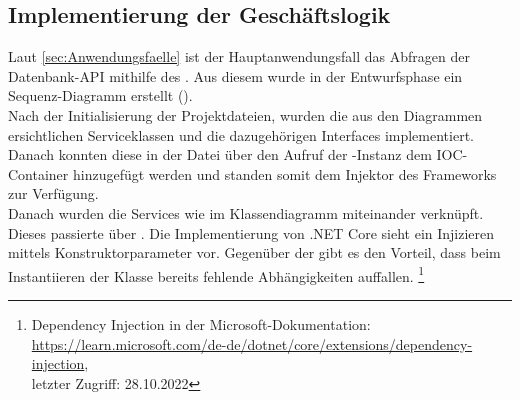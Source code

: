 \subsection{Implementierung der Geschäftslogik}
\label{sec:ImplementierungGeschaeftslogik}
Laut \ref{sec:Anwendungsfaelle}  ist der Hauptanwendungsfall
das Abfragen der Datenbank-\acs{API} mithilfe des . Aus diesem wurde in 
der Entwurfsphase ein Sequenz-Diagramm erstellt (\Vgl {}).\\
Nach der Initialisierung der Projektdateien, wurden die aus den Diagrammen ersichtlichen Serviceklassen
und die dazugehörigen Interfaces implementiert. \\Danach konnten diese in der Datei 
über den Aufruf  der -Instanz dem \acs{IOC}-Container 
hinzugefügt werden und standen somit dem Injektor des Frameworks zur Verfügung. \\Danach 
wurden die Services wie im Klassendiagramm  miteinander verknüpft.
Dieses passierte über . Die Implementierung von .NET Core 
sieht ein Injizieren mittels Konstruktorparameter vor. Gegenüber der  gibt es
den Vorteil, dass beim Instantiieren der Klasse bereits fehlende Abhängigkeiten auffallen.
\footnote{Dependency Injection in der Microsoft-Dokumentation:\\ 
\url{https://learn.microsoft.com/de-de/dotnet/core/extensions/dependency-injection}, \\
letzter Zugriff: 28.10.2022}

